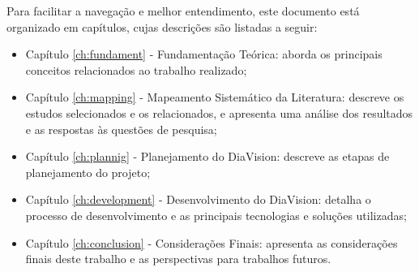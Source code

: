 Para facilitar a navegação e melhor entendimento, este documento está organizado em capítulos, cujas descrições são listadas a seguir:
\begin{itemize}
    \item Capítulo \ref{ch:fundament} - Fundamentação Teórica: aborda os principais conceitos relacionados ao trabalho realizado;
    \item Capítulo \ref{ch:mapping} - Mapeamento Sistemático da Literatura: descreve os estudos selecionados e os relacionados,
     e apresenta uma análise dos resultados e as respostas às questões de pesquisa;
    \item Capítulo \ref{ch:plannig} - Planejamento do DiaVision: descreve as etapas de planejamento do projeto;
    \item Capítulo \ref{ch:development} - Desenvolvimento do DiaVision: detalha o processo de desenvolvimento e as principais tecnologias e soluções utilizadas;
    \item Capítulo \ref{ch:conclusion} - Considerações Finais: apresenta as considerações finais deste trabalho e as perspectivas para trabalhos futuros.
\end{itemize}
